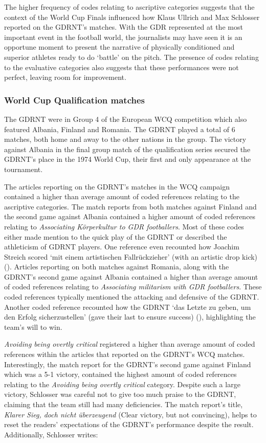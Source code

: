The higher frequency of codes relating to ascriptive categories suggests that the context of the World Cup Finals influenced how Klaus Ullrich and Max Schlosser reported on the GDRNT’s matches. With the GDR represented at the most important event in the football world, the journalists may have seen it is an opportune moment to present the narrative of physically conditioned and superior athletes ready to do ‘battle’ on the pitch. The presence of codes relating to the evaluative categories also suggests that these performances were not perfect, leaving room for improvement.

\subsubsection*{World Cup Qualification matches}

The GDRNT were in Group 4 of the European WCQ competition which also featured Albania, Finland and Romania. The GDRNT played a total of 6 matches, both home and away to the other nations in the group. The victory against Albania in the final group match of the qualification series secured the GDRNT’s place in the 1974 World Cup, their first and only appearance at the tournament.

The articles reporting on the GDRNT’s matches in the WCQ campaign contained a higher than average amount of coded references relating to the ascriptive categories. The match reports from both matches against Finland and the second game against Albania contained a higher amount of coded references relating to \textit{Associating Körperkultur to GDR footballers}. Most of these codes either made mention to the quick play of the GDRNT or described the athleticism of GDRNT players. One reference even recounted how Joachim Streich scored ‘mit einem artistischen Fallrückzieher’ (with an artistic drop kick) (\cite{nd19730607}). Articles reporting on both matches against Romania, along with the GDRNT’s second game against Albania contained a higher than average amount of coded references relating to \textit{Associating militarism with GDR footballers}. These coded references typically mentioned the attacking and defensive of the GDRNT. Another coded reference recounted how the GDRNT ‘das Letzte zu geben, um den Erfolg sicherzustellen’ (gave their last to ensure success) (\cite{nd19730927}), highlighting the team’s will to win.

\textit{Avoiding being overtly critical} registered a higher than average amount of coded references within the articles that reported on the GDRNT’s WCQ matches. Interestingly, the match report for the GDRNT’s second game against Finland which was a 5-1 victory, contained the highest amount of coded references relating to the \textit{Avoiding being overtly critical} category. Despite such a large victory, Schlosser was careful not to give too much praise to the GDRNT, claiming that the team still had many deficiencies. The match report’s title, \textit{Klarer Sieg, doch nicht überzeugend} (Clear victory, but not convincing), helps to reset the readers’ expectations of the GDRNT’s performance despite the result. Additionally, Schlosser writes:

